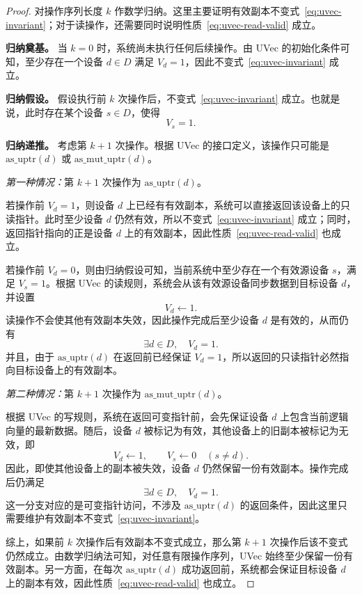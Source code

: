 \begin{proof}
对操作序列长度 \(k\) 作数学归纳。这里主要证明有效副本不变式~\eqref{eq:uvec-invariant}；对于读操作，还需要同时说明性质~\eqref{eq:uvec-read-valid} 成立。

\medskip\noindent\textbf{归纳奠基。}
当 \(k = 0\) 时，系统尚未执行任何后续操作。由 UVec 的初始化条件可知，至少存在一个设备 \(d \in D\) 满足 \(V_d = 1\)，因此不变式~\eqref{eq:uvec-invariant} 成立。

\medskip\noindent\textbf{归纳假设。}
假设执行前 \(k\) 次操作后，不变式~\eqref{eq:uvec-invariant} 成立。也就是说，此时存在某个设备 \(s \in D\)，使得
\[
  V_s = 1.
\]

\medskip\noindent\textbf{归纳递推。}
考虑第 \(k+1\) 次操作。根据 UVec 的接口定义，该操作只可能是 \(\mathrm{as\_uptr}(d)\) 或 \(\mathrm{as\_mut\_uptr}(d)\)。

\smallskip\noindent\textit{第一种情况：}第 \(k+1\) 次操作为 \(\mathrm{as\_uptr}(d)\)。

若操作前 \(V_d = 1\)，则设备 \(d\) 上已经有有效副本，系统可以直接返回该设备上的只读指针。此时至少设备 \(d\) 仍然有效，所以不变式~\eqref{eq:uvec-invariant} 成立；同时，返回指针指向的正是设备 \(d\) 上的有效副本，因此性质~\eqref{eq:uvec-read-valid} 也成立。

若操作前 \(V_d = 0\)，则由归纳假设可知，当前系统中至少存在一个有效源设备 \(s\)，满足 \(V_s = 1\)。根据 UVec 的读规则，系统会从该有效源设备同步数据到目标设备 \(d\)，并设置
\[
  V_d \leftarrow 1.
\]
读操作不会使其他有效副本失效，因此操作完成后至少设备 \(d\) 是有效的，从而仍有
\[
  \exists d \in D,\quad V_d = 1.
\]
并且，由于 \(\mathrm{as\_uptr}(d)\) 在返回前已经保证 \(V_d = 1\)，所以返回的只读指针必然指向目标设备上的有效副本。

\smallskip\noindent\textit{第二种情况：}第 \(k+1\) 次操作为 \(\mathrm{as\_mut\_uptr}(d)\)。

根据 UVec 的写规则，系统在返回可变指针前，会先保证设备 \(d\) 上包含当前逻辑向量的最新数据。随后，设备 \(d\) 被标记为有效，其他设备上的旧副本被标记为无效，即
\[
  V_d \leftarrow 1,\qquad V_s \leftarrow 0 \quad (s \ne d).
\]
因此，即使其他设备上的副本被失效，设备 \(d\) 仍然保留一份有效副本。操作完成后仍满足
\[
  \exists d \in D,\quad V_d = 1.
\]
这一分支对应的是可变指针访问，不涉及 \(\mathrm{as\_uptr}(d)\) 的返回条件，因此这里只需要维护有效副本不变式~\eqref{eq:uvec-invariant}。

\medskip\noindent{}综上，如果前 \(k\) 次操作后有效副本不变式成立，那么第 \(k+1\) 次操作后该不变式仍然成立。由数学归纳法可知，对任意有限操作序列，UVec 始终至少保留一份有效副本。另一方面，在每次 \(\mathrm{as\_uptr}(d)\) 成功返回前，系统都会保证目标设备 \(d\) 上的副本有效，因此性质~\eqref{eq:uvec-read-valid} 也成立。
\end{proof}

